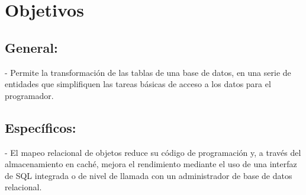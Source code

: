 \documentclass[%
 reprint,
 amsmath,amssymb,
 aps,
]{revtex4-1}
\begin{document}
\section{Objetivos}\label{sec:2}
\subsection{General:}
-  Permite la transformación de las tablas de una base de datos, en una serie de entidades que simplifiquen las tareas básicas de acceso a los datos para el programador.
\subsection{Específicos:}
- El mapeo relacional de objetos reduce su código de programación y, a través del almacenamiento en caché, mejora el rendimiento mediante el uso de una interfaz de SQL integrada o de nivel de llamada con un administrador de base de datos relacional. 

\end{document}

